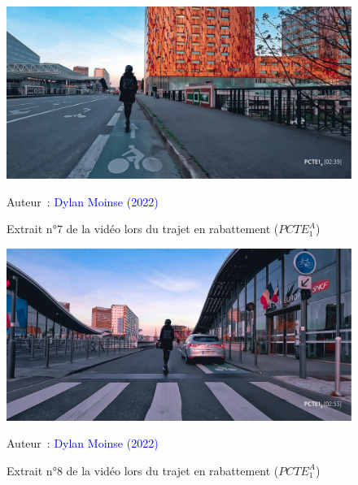     \begin{figure}[h!]\vspace*{4pt}
        \caption*{Extrait n°7 de la vidéo lors du trajet en rabattement (\(PCTE^{A}_{1}\))}
        \centerline{\includegraphics[width=0.75\columnwidth]{src/Figures/Annexes/Extrait_Video_PCTE1_Access_7.jpg}}
        \vspace{5pt}
        \begin{flushright}\scriptsize{
        Auteur~: \textcolor{blue}{Dylan Moinse (2022)}
        }\end{flushright}
    \end{figure}

    \begin{figure}[h!]\vspace*{4pt}
        \caption*{Extrait n°8 de la vidéo lors du trajet en rabattement (\(PCTE^{A}_{1}\))}
        \centerline{\includegraphics[width=0.75\columnwidth]{src/Figures/Annexes/Extrait_Video_PCTE1_Access_8.jpg}}
        \vspace{5pt}
        \begin{flushright}\scriptsize{
        Auteur~: \textcolor{blue}{Dylan Moinse (2022)}
        }\end{flushright}
    \end{figure}

